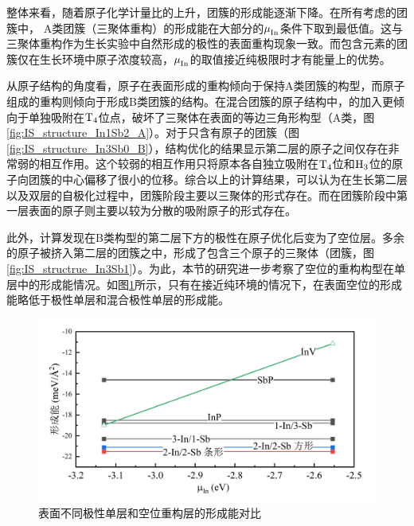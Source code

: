 整体来看，随着原子化学计量比的上升，团簇的形成能逐渐下降。在所有考虑的团簇中， A类团簇（三聚体重构）的形成能在大部分的$\it \mu_{\rm In}^{\rm } \it$条件下取到最低值。这与三聚体重构作为生长实验中自然形成的极性的表面重构现象一致。而包含元素的团簇仅在生长环境中原子浓度较高，$\it \mu_{\rm In}^{\rm } \it$的取值接近纯极限时才有能量上的优势。

从原子结构的角度看，原子在表面形成的重构倾向于保持A类团簇的构型，而原子组成的重构则倾向于形成B类团簇的结构。在混合团簇的原子结构中，的加入更倾向于单独吸附在$\rm T_{4} \it$位点，破坏了三聚体在表面的等边三角形构型（A类，图\ref{fig:IS_structure_In1Sb2_A}）。对于只含有原子的团簇（图\ref{fig:IS_structure_In3Sb0_B}），结构优化的结果显示第二层的原子之间仅存在非常弱的相互作用。这个较弱的相互作用只将原本各自独立吸附在$\rm T_{4} \it$位和$\rm H_{3} \it$位的原子向团簇的中心偏移了很小的位移。综合以上的计算结果，可以认为在生长第二层以及双层的自极化过程中，团簇阶段主要以三聚体的形式存在。而在团簇阶段中第一层表面的原子则主要以较为分散的吸附原子的形式存在。

此外，计算发现在B类构型的第二层下方的极性在原子优化后变为了空位层。多余的原子被挤入第二层的团簇之中，形成了包含三个原子的三聚体（团簇，图\ref{fig:IS_structrue_In3Sb1}）。为此，本节的研究进一步考察了空位的重构构型在单层中的形成能情况。如图\ref{fig:IS_DFT_1InSb_FlipVsInV}所示，只有在接近纯环境的情况下，在表面空位的形成能略低于极性单层和混合极性单层的形成能。

\begin{figure}[htb]
    \includegraphics{pic/IS_DFT_1InSb_FlipVsInV.png}
    \caption{表面不同极性单层和空位重构层的形成能对比}
    \label{fig:IS_DFT_1InSb_FlipVsInV}
\end{figure}

